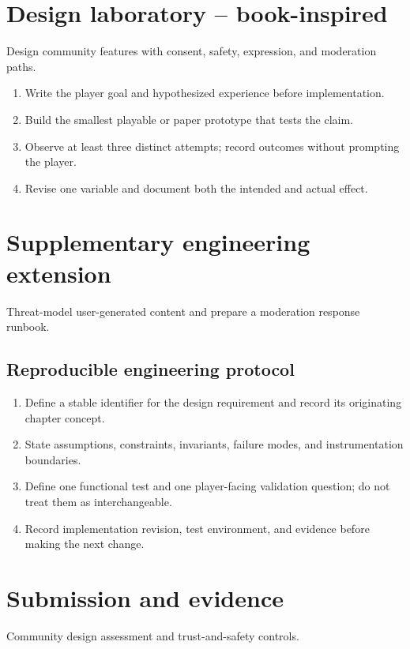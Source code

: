 \documentclass[11pt]{article}
\begin{document}
\section{Design laboratory -- book-inspired}
Design community features with consent, safety, expression, and moderation paths.

\begin{enumerate}
\item Write the player goal and hypothesized experience before implementation.
\item Build the smallest playable or paper prototype that tests the claim.
\item Observe at least three distinct attempts; record outcomes without prompting the player.
\item Revise one variable and document both the intended and actual effect.
\end{enumerate}

\section{Supplementary engineering extension}
Threat-model user-generated content and prepare a moderation response runbook.


\subsection{Reproducible engineering protocol}
\begin{enumerate}
\item Define a stable identifier for the design requirement and record its originating chapter concept.
\item State assumptions, constraints, invariants, failure modes, and instrumentation boundaries.
\item Define one functional test and one player-facing validation question; do not treat them as interchangeable.
\item Record implementation revision, test environment, and evidence before making the next change.
\end{enumerate}

\section{Submission and evidence}
Community design assessment and trust-and-safety controls.
\end{document}
